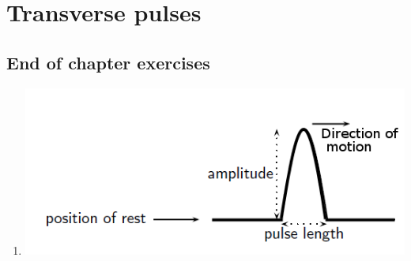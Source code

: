 \section{Transverse pulses}
% 

\subsection{End of chapter exercises} 

\begin{enumerate}[noitemsep, label=\textbf{\arabic*}. ] 
\item %
\includegraphics[width=.4\textwidth]{photos/transverse_pulses_eocex.png}
\end{enumerate}

